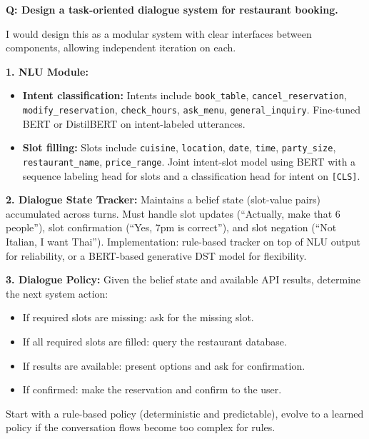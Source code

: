 \begin{interviewq}
\textbf{Q: Design a task-oriented dialogue system for restaurant booking.}

 \quad {} \quad \badgefreq{\freqmed}

\stronganswer
I would design this as a modular system with clear interfaces between components, allowing
independent iteration on each.

\textbf{1. NLU Module:}
\begin{itemize}
    \item \textbf{Intent classification:} Intents include \texttt{book\_table},
    \texttt{cancel\_reservation}, \texttt{modify\_reservation}, \texttt{check\_hours},
    \texttt{ask\_menu}, \texttt{general\_inquiry}.  Fine-tuned BERT or DistilBERT on
    intent-labeled utterances.
    \item \textbf{Slot filling:} Slots include \texttt{cuisine}, \texttt{location},
    \texttt{date}, \texttt{time}, \texttt{party\_size}, \texttt{restaurant\_name},
    \texttt{price\_range}.  Joint intent-slot model using BERT with a sequence labeling
    head for slots and a classification head for intent on \texttt{[CLS]}.
\end{itemize}

\textbf{2. Dialogue State Tracker:}
Maintains a belief state (slot-value pairs) accumulated across turns.  Must handle slot
updates (``Actually, make that 6 people''), slot confirmation (``Yes, 7pm is correct''), and
slot negation (``Not Italian, I want Thai'').  Implementation: rule-based tracker on top of
NLU output for reliability, or a BERT-based generative DST model for flexibility.

\textbf{3. Dialogue Policy:}
Given the belief state and available API results, determine the next system action:
\begin{itemize}
    \item If required slots are missing: ask for the missing slot.
    \item If all required slots are filled: query the restaurant database.
    \item If results are available: present options and ask for confirmation.
    \item If confirmed: make the reservation and confirm to the user.
\end{itemize}
Start with a rule-based policy (deterministic and predictable), evolve to a learned policy if
the conversation flows become too complex for rules.


\end{interviewq}
